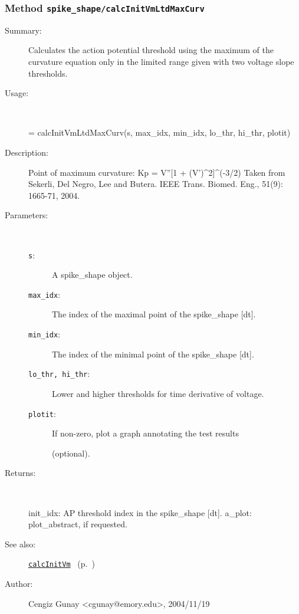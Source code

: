 \subsubsection[Method \texttt{calcInitVmLtdMaxCurv}]{Method \texttt{spike\_shape/calcInitVmLtdMaxCurv}}%
%
\label{ref_spike_shape__calcInitVmLtdMaxCurv}%
\hypertarget{ref_spike_shape__calcInitVmLtdMaxCurv}{}%
\begin{description}
\item[Summary:]Calculates the action potential threshold using the maximum of the curvature equation only in the limited range given with two voltage slope thresholds.
%
\item[Usage:]~%
\begin{lyxcode}%
[init\_idx, a\_plot] = calcInitVmLtdMaxCurv(s, max\_idx, min\_idx, lo\_thr, hi\_thr, plotit)
%
\end{lyxcode}%
%
\item[Description:]%
Point of maximum curvature: Kp = V''[1 + (V')\textasciicircum{}2]\textasciicircum{}(-3/2)
 Taken from Sekerli, Del Negro, Lee and Butera. 
 IEEE Trans. Biomed. Eng., 51(9): 1665-71, 2004.
\item[Parameters:]~
\begin{description}%
\item[\texttt{s}:]
 A spike\_shape object.
\item[\texttt{max\_idx}:]
 The index of the maximal point of the spike\_shape [dt].
\item[\texttt{min\_idx}:]
 The index of the minimal point of the spike\_shape [dt].
\item[\texttt{lo\_thr, hi\_thr}:]
 Lower and higher thresholds for time derivative of voltage.
\item[\texttt{plotit}:]
 If non-zero, plot a graph annotating the test results 

(optional).\end{description}%
%
\item[Returns:]~

	init\_idx: AP threshold index in the spike\_shape [dt].
	a\_plot: plot\_abstract, if requested.
%
%
\item[See also:]%
\hyperlink{ref_calcInitVm}{\texttt{calcInitVm}}%
\ (p.~\pageref{ref_calcInitVm})%
%
%
\item[Author:]%
Cengiz Gunay <cgunay@emory.edu>, 2004/11/19%
\end{description}
\methodline%
